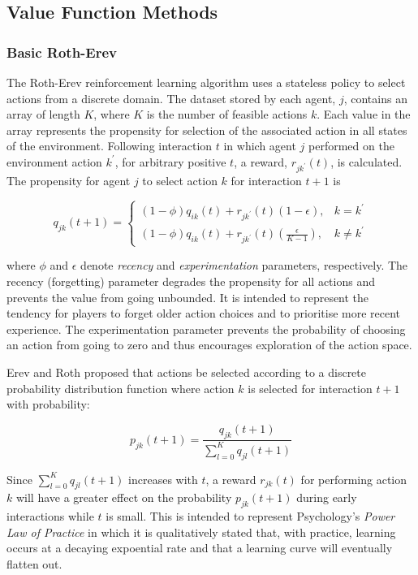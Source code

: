 \subsection{Value Function Methods}

\subsubsection{Basic Roth-Erev}
\label{sec:rotherev}
The Roth-Erev reinforcement learning algorithm uses a stateless policy to
select actions from a discrete domain\cite{roth:games,roth:aer}.  The dataset
stored by each agent, $j$, contains an array of length $K$, where $K$ is the
number of feasible actions $k$. Each value in the array represents the
propensity for selection of the associated action in all states of the
environment.  Following interaction $t$ in which agent $j$ performed on the
environment action $k^\prime$, for arbitrary positive $t$, a reward,
$r_{jk^\prime}(t)$, is calculated.  The propensity for agent $j$ to select
action $k$ for interaction $t+1$ is

\begin{equation}
q_{jk}(t+1) =
\begin{cases}
(1-\phi)q_{ik}(t) + r_{jk^\prime}(t)(1-\epsilon), & \text{$k = k^\prime$} \\
(1-\phi)q_{ik}(t) + r_{jk^\prime}(t)(\frac{\epsilon}{K-1}), & \text{$k \ne
k^\prime$}
\end{cases}
\end{equation}

where $\phi$ and $\epsilon$ denote \textit{recency} and
\textit{experimentation} parameters, respectively. The recency (forgetting)
parameter degrades the propensity for all actions and prevents the value from
going unbounded.  It is intended to represent the tendency for players to
forget older action choices and to prioritise more recent experience.  The
experimentation parameter prevents the probability of choosing an action from
going to zero and thus encourages exploration of the action space.

Erev and Roth proposed that actions be selected according to a discrete
probability distribution function where action $k$ is selected for interaction
$t+1$ with probability:

\begin{equation}
p_{jk}(t+1) = \frac{q_{jk}(t+1)}{\sum_{l=0}^K q_{jl}(t+1)}
\end{equation}

Since $\sum_{l=0}^K q_{jl}(t+1)$ increases with $t$, a reward $r_{jk}(t)$ for
performing action $k$ will have a greater effect on the probability
$p_{jk}(t+1)$ during early interactions while $t$ is small.  This is intended
to represent Psychology's \textit{Power Law of Practice} in which it is
qualitatively stated that, with practice, learning occurs at a decaying
expoential rate and that a learning curve will eventually flatten out.

